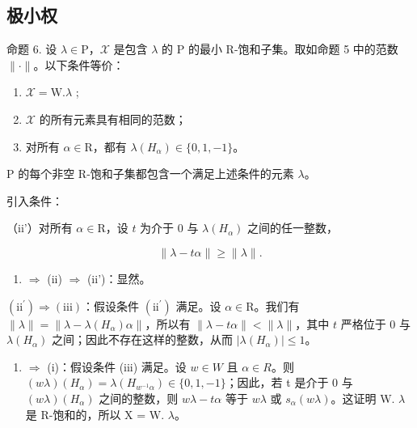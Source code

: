 \subsection{极小权}

命题 6. 设 \(\lambda \in \mathrm{P}\)，\(\mathcal{X}\) 是包含 \(\lambda\) 的 P 的最小 R-饱和子集。取如命题 5 中的范数 \(\| \cdot \|\)。以下条件等价：

\begin{enumerate}
\def\labelenumi{(\roman{enumi})}
\item
  \(\mathcal{X} = \mathrm{W}.\lambda\) ;
\item
  \(\mathcal{X}\) 的所有元素具有相同的范数；
\item
  对所有 \(\alpha \in \mathrm{R}\)，都有 \(\lambda(H_{\alpha}) \in \{0,1,-1\}\)。
\end{enumerate}

P 的每个非空 R-饱和子集都包含一个满足上述条件的元素 \(\lambda\)。

引入条件：

（ii'）对所有 \(\alpha \in \mathrm{R}\)，设 \(t\) 为介于 0 与 \(\lambda(H_{\alpha})\) 之间的任一整数，

\[
\| \lambda - t \alpha \| \geq \| \lambda \|.
\]

\begin{enumerate}
\def\labelenumi{(\roman{enumi})}
\tightlist
\item
  \(\Longrightarrow\) (ii) \(\Longrightarrow\) (ii')：显然。
\end{enumerate}

\((\mathrm{ii}^{\prime}) \Longrightarrow (\mathrm{iii})\)：假设条件 \((\mathrm{ii}^{\prime})\) 满足。设 \(\alpha \in \mathrm{R}\)。我们有 \(\| \lambda \| = \| \lambda - \lambda (H_{\alpha})\alpha \|\)，所以有 \(\| \lambda - t\alpha \| < \| \lambda \|\)，其中 \(t\) 严格位于 0 与 \(\lambda (H_{\alpha})\) 之间；因此不存在这样的整数，从而 \(|\lambda (H_{\alpha})| \leq 1\)。

\begin{enumerate}
\def\labelenumi{(\roman{enumi})}
\setcounter{enumi}{2}
\tightlist
\item
  \(\Longrightarrow\) (i)：假设条件 (iii) 满足。设 \(w \in W\) 且 \(\alpha \in R\)。则 \((w\lambda)(H_{\alpha}) = \lambda(H_{w^{-1}\alpha}) \in \{0,1,-1\}\)；因此，若 t 是介于 0 与 \((w\lambda)(H_{\alpha})\) 之间的整数，则 \(w\lambda - t\alpha\) 等于 \(w\lambda\) 或 \(s_{\alpha}(w\lambda)\)。这证明 W. \(\lambda\) 是 R-饱和的，所以 X = W. \(\lambda\)。
\end{enumerate}

